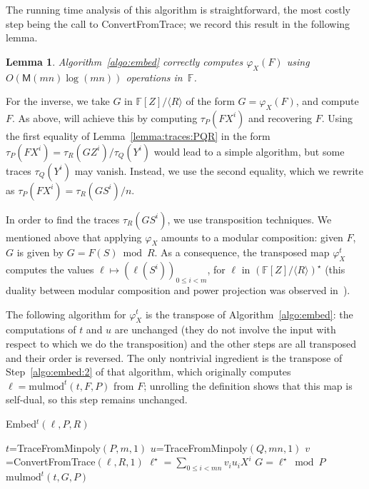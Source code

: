 \documentclass[12pt]{article}
\def\M {\ensuremath{\mathsf{M}}}
\def\F {\ensuremath{\mathbb{F}}}
\def\mulmod {\ensuremath{\mathrm{mulmod}}}
\newtheorem{Lemma}{Lemma}
\begin{document}
The running time analysis of this algorithm is straightforward, the most
costly step being the call to ConvertFromTrace; we record this result in 
the following lemma. 

\begin{Lemma}\label{lemma:algo:embed}
  Algorithm~\ref{algo:embed} correctly computes $\varphi_X(F)$
  using $O(\M(mn)\log(mn))$ operations in~$\F$.
\end{Lemma}



For the inverse, we take $G$ in $\F[Z]/\langle R \rangle$ of the form
$G=\varphi_X(F)$, and compute $F$. As above, will achieve this by
computing $\tau_P(F X^i)$ and recovering $F$. Using the first equality
of Lemma~\ref{lemma:traces:PQR} in the form $\tau_P(F X^i) =\tau_R(G
Z^i)/\tau_Q(Y^i)$ would lead to a simple algorithm, but some traces
$\tau_Q(Y^i)$ may vanish. Instead, we use the second equality, which
we rewrite as $\tau_P(F X^i) =\tau_R(G S^i)/n$.

In order to find the traces $\tau_R(G S^i)$, we use transposition
techniques. We mentioned above that applying $\varphi_X$ amounts to a
modular composition: given $F$, $G$ is given by $G= F(S) \bmod R$. As
a consequence, the transposed map $\varphi_X^t$ computes the values
$\ell \mapsto (\ell(S^i))_{0 \le i < m}$, for $\ell$ in
$(\F[Z]/\langle R \rangle)^\star$ (this duality between modular
composition and power projection was observed in~\cite{shoup94}).

The following algorithm for $\varphi_X^t$ is the transpose of
Algorithm~\ref{algo:embed}: the computations of $t$ and $u$ are
unchanged (they do not involve the input with respect to which we do
the transposition) and the other steps are all transposed and their
order is reversed. The only nontrivial ingredient is the transpose of
Step~\ref{algo:embed:2} of that algorithm, which originally computes
$\ell= \mulmod^t(t,F,P)$ from $F$; unrolling the definition shows that
this map is self-dual, so this step remains unchanged.

\begin{algorithm}[H]
  \caption{Embed$^t(\ell,P,R)$}
  \begin{algorithmic}[1]
  \STATE $t$=TraceFromMinpoly$(P,m,1)$
  \STATE $u$=TraceFromMinpoly$(Q,mn,1)$
  \STATE $v$=ConvertFromTrace$(\ell, R, 1)$
  \STATE $\ell^\star=\sum_{0 \le i < mn} v_i u_i X^i$
  \STATE $G = \ell^\star \bmod P$
  \RETURN $\mulmod^t(t,G,P)$
  \end{algorithmic}\label{algo:embedT}
\end{algorithm}
\end{document}
